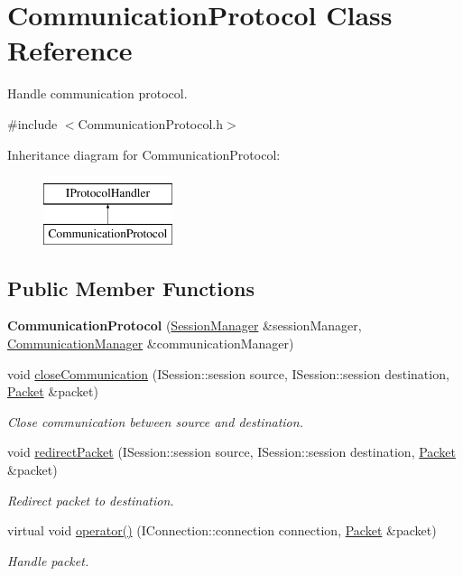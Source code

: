 \hypertarget{class_communication_protocol}{\section{Communication\-Protocol Class Reference}
\label{class_communication_protocol}
}


Handle communication protocol.  




{\ttfamily \#include $<$Communication\-Protocol.\-h$>$}

Inheritance diagram for Communication\-Protocol\-:\begin{figure}[H]
\begin{center}
\leavevmode
\includegraphics[height=2.000000cm]{class_communication_protocol}
\end{center}
\end{figure}
\subsection*{Public Member Functions}
\begin{DoxyCompactItemize}
\item 
\hypertarget{class_communication_protocol_a32b69b9b85454de9a05be614fcd99d58}{{\bfseries Communication\-Protocol} (\hyperlink{class_session_manager}{Session\-Manager} \&session\-Manager, \hyperlink{class_communication_manager}{Communication\-Manager} \&communication\-Manager)}\label{class_communication_protocol_a32b69b9b85454de9a05be614fcd99d58}

\item 
void \hyperlink{class_communication_protocol_aef79d1dc63ca6da6d656b875a3cb0889}{close\-Communication} (I\-Session\-::session source, I\-Session\-::session destination, \hyperlink{class_packet}{Packet} \&packet)
\begin{DoxyCompactList}\small\item\em Close communication between source and destination. \end{DoxyCompactList}\item 
void \hyperlink{class_communication_protocol_a6b56df7aaf70f7d1c91d3b7eee63562d}{redirect\-Packet} (I\-Session\-::session source, I\-Session\-::session destination, \hyperlink{class_packet}{Packet} \&packet)
\begin{DoxyCompactList}\small\item\em Redirect packet to destination. \end{DoxyCompactList}\item 
virtual void \hyperlink{class_communication_protocol_a441c1ee5d4482e759c7bb88922c2ef55}{operator()} (I\-Connection\-::connection connection, \hyperlink{class_packet}{Packet} \&packet)
\begin{DoxyCompactList}\small\item\em Handle packet. \end{DoxyCompactList}\end{DoxyCompactItemize}


